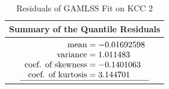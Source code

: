 


\begin{table}[H]
\centering
\begin{tabular}{c}
\hline
\rowcolor{white} 
\textbf{Summary of the Quantile Residuals} \\ \hline\hline
 $\begin{array}[t]{ r @{{}={}} l }
\text{mean} & -0.01692598                         \\ 
\text{variance} & 1.011483                         \\ 
\text{coef. of skewness} & -0.1401063               \\ 
\text{coef. of kurtosis} & 3.144701                \\ \hline
\end{array}$
\end{tabular}
\caption{Residuals of GAMLSS Fit on KCC 2}
\label{tab:gamlss_residuals_kcc_6}
\end{table}



















